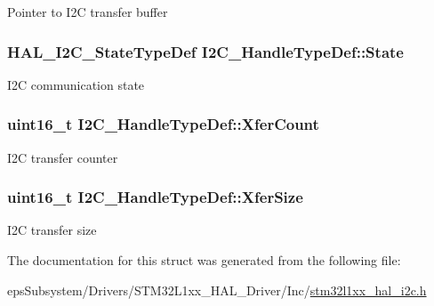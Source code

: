 Pointer to I2\-C transfer buffer \hypertarget{struct_i2_c___handle_type_def_a5b37a3a29bc768fb1c3ff192ab94b6e3}{
\subsubsection[{State}]{ {\bf H\-A\-L\-\_\-\-I2\-C\-\_\-\-State\-Type\-Def} I2\-C\-\_\-\-Handle\-Type\-Def\-::\-State}}\label{struct_i2_c___handle_type_def_a5b37a3a29bc768fb1c3ff192ab94b6e3}
I2\-C communication state \hypertarget{struct_i2_c___handle_type_def_a1860b3cf8f463c2751d0c935f33e0ad4}{
\subsubsection[{Xfer\-Count}]{ uint16\-\_\-t I2\-C\-\_\-\-Handle\-Type\-Def\-::\-Xfer\-Count}}\label{struct_i2_c___handle_type_def_a1860b3cf8f463c2751d0c935f33e0ad4}
I2\-C transfer counter \hypertarget{struct_i2_c___handle_type_def_a47afa75961930ab1743f47245fdf6e85}{
\subsubsection[{Xfer\-Size}]{\setlength{\rightskip}{0pt plus 5cm}uint16\-\_\-t I2\-C\-\_\-\-Handle\-Type\-Def\-::\-Xfer\-Size}}\label{struct_i2_c___handle_type_def_a47afa75961930ab1743f47245fdf6e85}
I2\-C transfer size 

The documentation for this struct was generated from the following file\-:\begin{DoxyCompactItemize}
\item 
eps\-Subsystem/\-Drivers/\-S\-T\-M32\-L1xx\-\_\-\-H\-A\-L\-\_\-\-Driver/\-Inc/\hyperlink{stm32l1xx__hal__i2c_8h}{stm32l1xx\-\_\-hal\-\_\-i2c.\-h}\end{DoxyCompactItemize}
